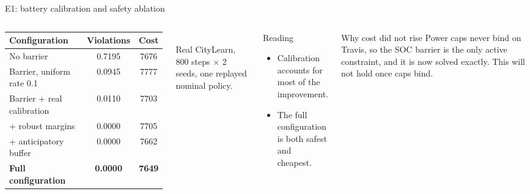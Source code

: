\documentclass[aspectratio=169,10pt]{beamer}
\begin{document}
\begin{frame}{E1: battery calibration and safety ablation}
\begin{columns}[T]
\small
\begin{tabular}{@{}lcc@{}}
\toprule
Configuration & Violations & Cost \\
\midrule
No barrier & 0.7195 & 7676 \\
Barrier, uniform rate 0.1 & 0.0945 & 7777 \\
Barrier + real calibration & 0.0110 & 7703 \\
\quad + robust margins & 0.0000 & 7705 \\
\quad + anticipatory buffer & 0.0000 & 7662 \\
\textbf{Full configuration} & \textbf{0.0000} & \textbf{7649} \\
\bottomrule
\end{tabular}\\[4pt]
Real CityLearn, 800 steps $\times$ 2 seeds, one replayed nominal policy.
\begin{exampleblock}{Reading}
\begin{itemize}
  \item Calibration accounts for most of the improvement.
  \item The full configuration is both safest and cheapest.
\end{itemize}
\end{exampleblock}
\begin{alertblock}{Why cost did not rise}
Power caps never bind on Travis, so the SOC barrier is the only active constraint, and it is now solved exactly. This will not hold once caps bind.
\end{alertblock}
\end{columns}
\end{frame}
\end{document}
